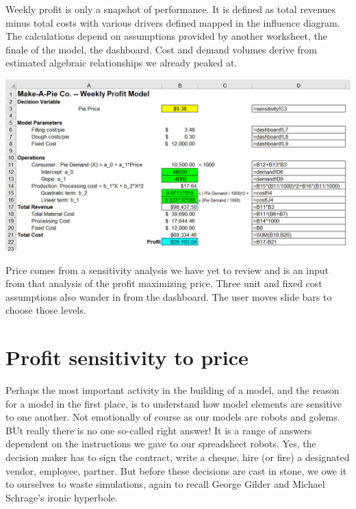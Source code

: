 \documentclass[
]{book}
\begin{document}
Weekly profit is only a snapshot of performance. It is defined as total revenues minus total costs with various drivers defined mapped in the influence diagram. The calculations depend on assumptions provided by another worksheet, the finale of the model, the dashboard. Cost and demand volumes derive from estimated algebraic relationships we already peaked at.

\includegraphics{images/01/pie-profit.jpg}

Price comes from a sensitivity analysis we have yet to review and is an input from that analysis of the profit maximizing price. Three unit and fixed cost assumptions also wander in from the dashboard. The user moves slide bars to choose those levels.

\hypertarget{profit-sensitivity-to-price}{%
\section{Profit sensitivity to price}\label{profit-sensitivity-to-price}}

Perhaps the most important activity in the building of a model, and the reason for a model in the first place, is to understand how model elements are sensitive to one another. Not emotionally of course as our models are robots and golems. BUt really there is no one so-called right answer! It is a range of answers dependent on the instructions we gave to our spreadsheet robots. Yes, the decision maker has to sign the contract, write a cheque, hire (or fire) a designated vendor, employee, partner. But before these decisions are cast in stone, we owe it to ourselves to waste simulations, again to recall George Gilder and Michael Schrage's ironic hyperbole.
\end{document}
